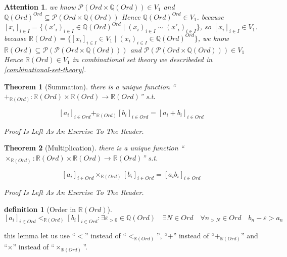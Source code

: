 \documentclass[10pt,a4paper]{book}
\newtheorem{definition}{definition}[section]
\newtheorem{theorem}{Theorem}[section]
\newtheorem{Attention}{Attention}[section]
\begin{document}
\begin{Attention}
    we know $ \mathcal{P}( Ord \times \mathbb{Q} (Ord) ) \in V_1$ and
    $ \mathbb{Q} (Ord)^{Ord} \subseteq \mathcal{P}( Ord \times \mathbb{Q} (Ord) )$ Hence $ \mathbb{Q} (Ord)^{Ord} \in V_1$.
    because $[x_i]_{i \in I} = \{ (x'_i)_{i \in I}  \in \mathbb{Q} (Ord)^{Ord} \mid (x_i)_{i \in I} \sim (x'_i)_{i \in I} \}$,
    so  $[x_i]_{i \in I} \in V_1$. because
    $ \mathbb{R} (Ord) = \{ [x_i]_{i \in I}\in V_1 \mid (x_i)_{i \in I} \in \mathbb{Q} (Ord)^{Ord} \}$,
    we know $ \mathbb{R} (Ord) \subseteq \mathcal{P}(\mathcal{P}( Ord \times \mathbb{Q} (Ord) ))$ and
    $ \mathcal{P}(\mathcal{P}( Ord \times \mathbb{Q} (Ord) )) \in V_1 $ Hence
    $\mathbb{R} (Ord) \in V_1$ in combinational set theory we describeded in \ref{combinational-set-theory}.
\end{Attention}

\begin{theorem}[Summation] there is a unique function ``$+_{\mathbb{R} (Ord)} :\mathbb{R} (Ord) \times \mathbb{R} (Ord) \to \mathbb{R} (Ord)$'' s.t.

    \[  [a_i]_{i \in Ord} +_{\mathbb{R} (Ord)} [b_i]_{i \in Ord}  = [a_i + b_i]_{i \in Ord} \]

    Proof Is Left As An Exercise To The Reader.
\end{theorem}

\begin{theorem}[Multiplication] there is a unique function ``$\times_{\mathbb{R} (Ord)} :\mathbb{R} (Ord) \times \mathbb{R} (Ord) \to \mathbb{R} (Ord)$'' s.t.

    \[  [a_i]_{i \in Ord} \times_{\mathbb{R} (Ord)} [b_i]_{i \in Ord}  = [a_i  b_i]_{i \in Ord} \]

    Proof Is Left As An Exercise To The Reader.
\end{theorem}

\begin{definition}[Order in $\mathbb{R} (Ord)$]
    \[  [a_i]_{i \in Ord} <_{\mathbb{R} (Ord)} [b_i]_{i \in Ord}  :
        \exists \varepsilon_{> 0} \in \mathbb{Q} (Ord) \quad \exists  N \in Ord   \quad \forall n_{ > N }  \in Ord  \quad
        b_n - \varepsilon    > a_n \]
\end{definition}

this lemma let us use ``$<$'' instead of ``$<_{\mathbb{R} (Ord)}$'', ``$+$''
instead of ``$+_{\mathbb{R} (Ord)}$'' and ``$\times$'' instead of
``$\times_{\mathbb{R} (Ord)}$''.
\end{document}
